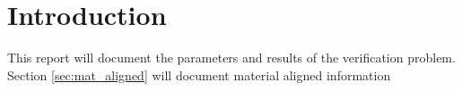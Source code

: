 \section{Introduction}
This report will document the parameters and results of the 
verification problem. 
Section \ref{sec:mat_aligned} will document material aligned information 